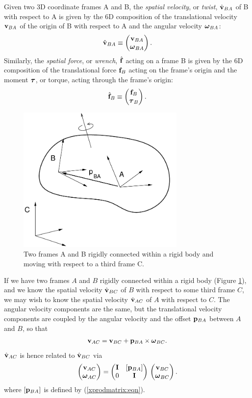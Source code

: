 Given two 3D coordinate frames A and B, the {\it spatial velocity},
or {\it twist},
$\hat{{\bf v}}_{BA}$ of B with respect to A is given by the 6D 
composition of the translational velocity ${\bf v}_{BA}$ of the
origin of B with respect to A and the angular velocity $\boldsymbol\omega_{BA}$:
%
\begin{equation}
\hat{{\bf v}}_{BA} \equiv \left(\begin{matrix} {\bf v}_{BA} \\ \boldsymbol\omega_{BA} \end{matrix}\right).
\end{equation}
%
Similarly, the {\it spatial force}, or {\it wrench}, $\hat{{\bf f}}$ acting
on a frame B is given by the 6D composition of the translational force
${\bf f}_B$ acting on the frame's origin and the moment $\boldsymbol\tau$, or torque,
acting through the frame's origin:
%
\begin{equation}
\hat{{\bf f}}_B \equiv \left(\begin{matrix} {\bf f}_B \\ \boldsymbol\tau_B \end{matrix}\right).
\end{equation}
%

\begin{figure}[ht]
\begin{center}
 \includegraphics[width=3.25in]{images/rigidAB}
\end{center}
\caption{Two frames A and B rigidly connected within a rigid body
and moving with respect to a third frame C.}
\label{rigidAB:fig}
\end{figure}

If we have two frames $A$ and $B$ rigidly connected within a rigid
body (Figure \ref{rigidAB:fig}), and we know the spatial velocity
$\hat{{\bf v}}_{BC}$ of $B$ with respect to some third frame $C$, we may wish
to know the spatial velocity $\hat{{\bf v}}_{AC}$ of $A$ with respect to $C$.
The angular velocity components are the same, but the translational
velocity components are coupled by the angular velocity and the offset
${\bf p}_{BA}$ between $A$ and $B$, so that
%
\begin{equation*}
{\bf v}_{AC} = {\bf v}_{BC} + {\bf p}_{BA} \times \boldsymbol\omega_{BC}.
\end{equation*}
%
$\hat{{\bf v}}_{AC}$ is hence related to $\hat{{\bf v}}_{BC}$ via
\begin{equation*}
\left(\begin{matrix} {\bf v}_{AC} \\ \boldsymbol\omega_{AC} \end{matrix}\right) =
\left(\begin{matrix} {\bf I} & [{\bf p}_{BA}] \\ 0 & {\bf I} \end{matrix}\right) \,
\left(\begin{matrix} {\bf v}_{BC} \\ \boldsymbol\omega_{BC} \end{matrix}\right).
\end{equation*}
%
where $[{\bf p}_{BA}]$ is defined by
(\ref{xprodmatrix:eqn}).


